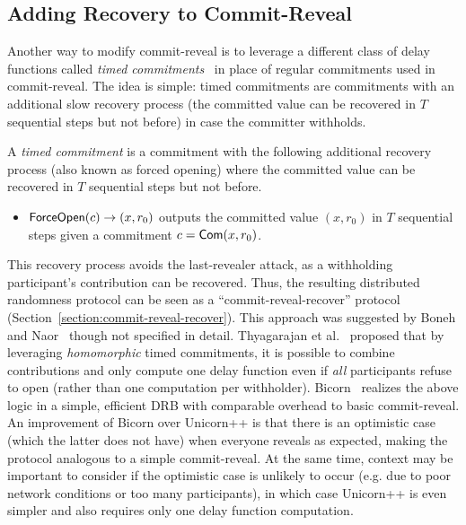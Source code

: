 \subsection{Adding Recovery to Commit-Reveal}
Another way to modify commit-reveal is to leverage a different class of delay functions called \textit{timed commitments}~\cite{boneh2000timed} in place of regular commitments used in commit-reveal.
The idea is simple: timed commitments are commitments with an additional slow recovery process (the committed value can be recovered in $T$ sequential steps but not before) in case the committer withholds.

\begin{definition}
A \textit{timed commitment} is a commitment with the following additional recovery process (also known as forced opening) where the committed value can be recovered in $T$ sequential steps but not before.
\begin{itemize}
\item $\mathsf{ForceOpen}(c) \rightarrow (x, r_0)$ outputs the committed value $(x, r_0)$ in $T$ sequential steps given a commitment $c = \mathsf{Com}(x, r_0)$.
\end{itemize}
\end{definition}

This recovery process avoids the last-revealer attack, as a withholding participant's contribution can be recovered. Thus, the resulting distributed randomness protocol can be seen as a ``commit-reveal-recover'' protocol (Section~\ref{section:commit-reveal-recover}).
This approach was suggested by Boneh and Naor~\cite{boneh2000timed} though not specified in detail.
Thyagarajan et al.~\cite{thyagarajan2021efficient} proposed that by leveraging \textit{homomorphic} timed commitments, it is possible to combine contributions and only compute one delay function even if \emph{all} participants refuse to open (rather than one computation per withholder).
Bicorn~\cite{choi2023bicorn} realizes the above logic in a simple, efficient DRB with comparable overhead to basic commit-reveal.
An improvement of Bicorn over Unicorn++ is that there is an optimistic case (which the latter does not have) when everyone reveals as expected, making the protocol analogous to a simple commit-reveal.
At the same time, context may be important to consider if the optimistic case is unlikely to occur (e.g. due to poor network conditions or too many participants), in which case Unicorn++ is even simpler and also requires only one delay function computation.

